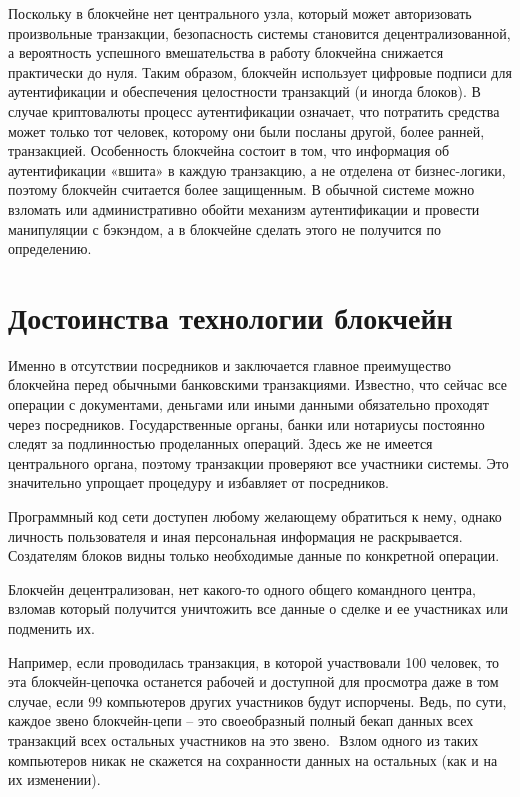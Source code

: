 \documentclass[och, master, nir]{SCWorks_fix}
\theoremstyle{plain}
\theoremstyle{plain}
\theoremstyle{plain}
\theoremstyle{definition}
\begin{document}
Поскольку в блокчейне нет центрального узла, который может авторизовать произвольные транзакции, безопасность системы становится децентрализованной, а вероятность успешного вмешательства в работу блокчейна снижается практически до нуля. Таким образом, блокчейн использует цифровые подписи для аутентификации и обеспечения целостности транзакций (и иногда блоков). В случае криптовалюты процесс аутентификации означает, что потратить средства может только тот человек, которому они были посланы другой, более ранней, транзакцией. Особенность блокчейна состоит в том, что информация об аутентификации «вшита» в каждую транзакцию, а не отделена от бизнес-логики, поэтому блокчейн считается более защищенным. В обычной системе можно взломать или административно обойти механизм аутентификации и провести манипуляции с бэкэндом, а в блокчейне сделать этого не получится по определению.

\section{Достоинства технологии блокчейн}

Именно в отсутствии посредников и заключается главное преимущество блокчейна перед обычными банковскими транзакциями\cite{bib:block:5}. Известно, что сейчас все операции с документами, деньгами или иными данными обязательно проходят через посредников. Государственные органы, банки или нотариусы постоянно следят за подлинностью проделанных операций. Здесь же не имеется центрального органа, поэтому транзакции проверяют все участники системы. Это значительно упрощает процедуру и избавляет от посредников.

Программный код сети доступен любому желающему обратиться к нему, однако личность пользователя и иная персональная информация не раскрывается. Создателям блоков видны только необходимые данные по конкретной операции. 

Блокчейн децентрализован, нет какого-то одного общего командного центра, взломав который получится уничтожить все данные о сделке и ее участниках или подменить их.

Например, если проводилась транзакция, в которой участвовали 100 человек, то эта блокчейн-цепочка останется рабочей и доступной для просмотра даже в том случае, если 99 компьютеров других участников будут испорчены. Ведь, по сути, каждое звено блокчейн-цепи – это своеобразный полный бекап данных всех транзакций всех остальных участников на это звено.  	Взлом одного из таких компьютеров никак не скажется на сохранности данных на остальных (как и на их изменении).
\end{document}
